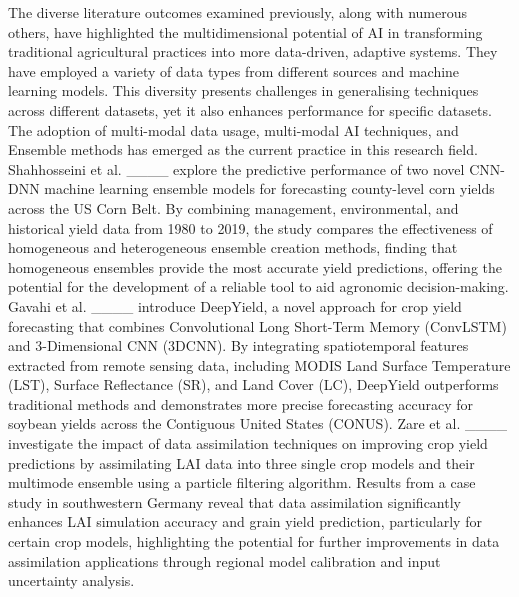 The diverse literature outcomes examined previously, along with numerous others, have highlighted the multidimensional potential of AI in transforming traditional agricultural practices into more data-driven, adaptive systems. They have employed a variety of data types from different sources and machine learning models. This diversity presents challenges in generalising techniques across different datasets, yet it also enhances performance for specific datasets. The adoption of multi-modal data usage, multi-modal AI techniques, and Ensemble methods has emerged as the current practice in this research field. Shahhosseini et al. ____ explore the predictive performance of two novel CNN-DNN machine learning ensemble models for forecasting county-level corn yields across the US Corn Belt. By combining management, environmental, and historical yield data from 1980 to 2019, the study compares the effectiveness of homogeneous and heterogeneous ensemble creation methods, finding that homogeneous ensembles provide the most accurate yield predictions, offering the potential for the development of a reliable tool to aid agronomic decision-making. Gavahi et al. ____ introduce DeepYield, a novel approach for crop yield forecasting that combines Convolutional Long Short-Term Memory (ConvLSTM) and 3-Dimensional CNN (3DCNN). By integrating spatiotemporal features extracted from remote sensing data, including MODIS Land Surface Temperature (LST), Surface Reflectance (SR), and Land Cover (LC), DeepYield outperforms traditional methods and demonstrates more precise forecasting accuracy for soybean yields across the Contiguous United States (CONUS). Zare et al. ____ investigate the impact of data assimilation techniques on improving crop yield predictions by assimilating LAI data into three single crop models and their multimode ensemble using a particle filtering algorithm. Results from a case study in southwestern Germany reveal that data assimilation significantly enhances LAI simulation accuracy and grain yield prediction, particularly for certain crop models, highlighting the potential for further improvements in data assimilation applications through regional model calibration and input uncertainty analysis.

